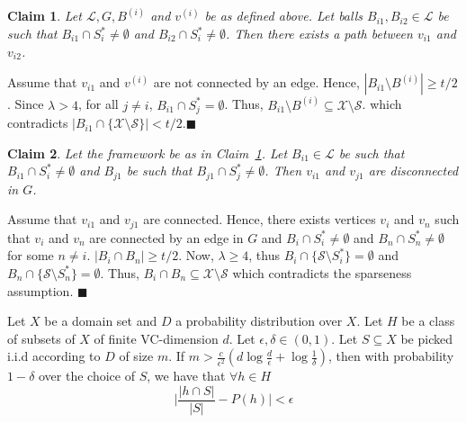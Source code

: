 \documentclass[orivec]{llncs}
\newtheorem{smallLemma}{Claim}
\newcommand{\mc}{\mathcal}
\renewcommand{\qed}{\hfill\ensuremath{\blacksquare}}
\begin{document}
\vspace{-0.1in}
\begin{smallLemma}
\label{claim:lambda1}
Let $\mc L, G, B^{(i)}$ and $v^{(i)}$ be as defined above. Let balls $B_{i1}, B_{i2} \in \mc L$ be such that $B_{i1} \cap S_i^* \neq \emptyset$ and $B_{i2} \cap S_i^* \neq \emptyset$. Then there exists a path between $v_{i1}$ and $v_{i2}$.
\end{smallLemma}
\vspace{-0.1in} Assume that $v_{i1}$ and $v^{(i)}$ are not connected by an edge. Hence, $|B_{i1} \setminus B^{(i)}| \ge t/2$. Since $\lambda > 4$, for all $j \neq i$, $B_{i1} \cap S_j^* = \emptyset$. Thus, $B_{i1} \setminus B^{(i)} \subseteq \mc X \setminus \mc S$. which contradicts $|B_{i1} \cap \{\mc X \setminus \mc S\}| < t/2$.\qed

\begin{smallLemma}
Let the framework be as in Claim~\ref{claim:lambda1}. Let $B_{i1} \in \mc L$ be such that $B_{i1} \cap S_i^* \neq \emptyset$ and $B_{j1}$ be such that $B_{j1} \cap S_j^* \neq \emptyset$. Then $v_{i1}$ and $v_{j1}$ are disconnected in $G$.
\end{smallLemma}
\vspace{-0.1in} Assume that $v_{i1}$ and $v_{j1}$ are connected. Hence, there exists vertices $v_{i}$ and $v_{n}$ such that $v_i$ and $v_n$ are connected by an edge in $G$ and $B_i \cap S_i^* \neq \emptyset$ and $B_n \cap S_n^* \neq \emptyset$ for some $n \neq i$. $|B_i \cap B_n| \ge t/2$. Now, $\lambda \ge 4$, thus $B_i \cap \{\mc S \setminus S_i^*\} = \emptyset$ and $B_n \cap \{\mc S\setminus S_n^*\} = \emptyset$. Thus, $B_i \cap B_n \subseteq \mc X \setminus \mc S$ which contradicts the sparseness assumption.
\qed

\label{appendix:sectiontr}
\begin{theorem}\label{theorem:vceapprox}
Let $X$ be a domain set and $D$ a probability distribution over $X$. Let $H$ be a class of subsets of $X$ of finite VC-dimension $d$. Let $\epsilon, \delta \in (0,1)$. Let $S \subseteq X$ be picked i.i.d according to $D$ of size $m$. If $m > \frac{c}{\epsilon^2}(d\log \frac{d}{\epsilon}+\log\frac{1}{\delta})$, then  with probability $1-\delta$ over the choice of $S$, we have that $\forall h \in H$
$$\bigg|\frac{|h\cap S|}{|S|} - P(h)\bigg| < \epsilon$$
\end{theorem}
\end{document}
